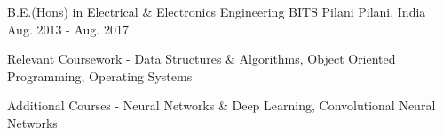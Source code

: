 

\begin{cventries}

  \cventry
    {B.E.(Hons) in Electrical \& Electronics Engineering} %
    {BITS Pilani} %
    {Pilani, India} %
    {Aug. 2013 - Aug. 2017} %
    {
      \begin{cvitems} %
        \item {Relevant Coursework - Data Structures \& Algorithms, Object Oriented Programming, Operating Systems}
        \item {Additional Courses - Neural Networks \& Deep Learning, Convolutional Neural Networks}
      \end{cvitems}
    }

\end{cventries}
